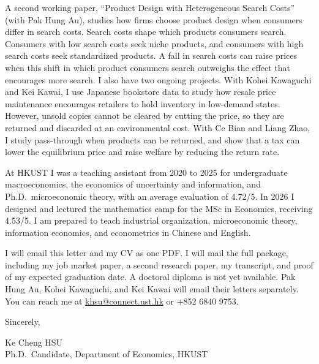 \documentclass[11pt]{article}
\begin{document}
A second working paper, ``Product Design with Heterogeneous Search Costs'' (with Pak Hung Au), studies how firms choose product design when consumers differ in search costs. Search costs shape which products consumers search. Consumers with low search costs seek niche products, and consumers with high search costs seek standardized products. A fall in search costs can raise prices when this shift in which product consumers search outweighs the effect that encourages more search. I also have two ongoing projects. With Kohei Kawaguchi and Kei Kawai, I use Japanese bookstore data to study how resale price maintenance encourages retailers to hold inventory in low-demand states. However, unsold copies cannot be cleared by cutting the price, so they are returned and discarded at an environmental cost. With Ce Bian and Liang Zhao, I study pass-through when products can be returned, and show that a tax can lower the equilibrium price and raise welfare by reducing the return rate.

At HKUST I was a teaching assistant from 2020 to 2025 for undergraduate macroeconomics, the economics of uncertainty and information, and Ph.D.\ microeconomic theory, with an average evaluation of 4.72/5. In 2026 I designed and lectured the mathematics camp for the MSc in Economics, receiving 4.53/5. I am prepared to teach industrial organization, microeconomic theory, information economics, and econometrics in Chinese and English.

I will email this letter and my CV as one PDF. I will mail the full package, including my job market paper, a second research paper, my transcript, and proof of my expected graduation date. A doctoral diploma is not yet available. Pak Hung Au, Kohei Kawaguchi, and Kei Kawai will email their letters separately. You can reach me at \href{mailto:khsu@connect.ust.hk}{khsu@connect.ust.hk} or +852 6840 9753.

\vspace{0.25em}
Sincerely,

\vspace{0.25em}
Ke Cheng HSU \\
Ph.D.\ Candidate, Department of Economics, HKUST
\end{document}
